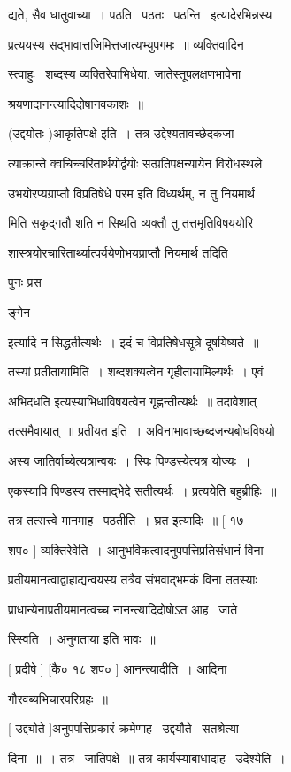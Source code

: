 \documentclass[11pt, openany]{book}
\begin{document}
द्यते, सैव धातुवाच्या~। पठति \textendash\ पठतः \textendash\ पठन्ति \textendash\ इत्यादेरभिन्नस्य 

प्रत्ययस्य सद्भावात्तजिमित्तजात्यभ्युपगमः~॥ व्यक्तिवादिन \textendash\ 

स्त्वाहुः \textendash\ शब्दस्य व्यक्तिरेवाभिधेया, जातेस्तूपलक्षणभावेना \textendash\ 

श्रयणादानन्त्यादिदोषानवकाशः~॥ 

(उद्दयोतः )आकृतिपक्षे इति~। तत्र उद्देश्यतावच्छेदकजा \textendash\ 

त्याक्रान्ते क्वचिच्चरितार्थयोर्द्वयोः सत्प्रतिपक्षन्यायेन विरोधस्थले 

{\qt उभयोरप्यग्राप्तौ विप्रतिषेधे परम} इति विध्यर्थम्, न तु नियमार्थ \textendash\ 

मिति सकृद्गतौ शति न सिथति व्यक्तौ तु तत्तमृतिविषययोरि 

शास्त्रयोरचारितार्थ्यात्पर्ययेणोभयप्राप्तौ नियमार्थ तदिति {\qt पुनः प्रस \textendash\ 

ङ्गेन} इत्यादि न सिद्धतीत्यर्थः~। इदं च विप्रतिषेधसूत्रे दूषयिष्यते~॥


तस्यां प्रतीतायामिति~। शब्दशक्यत्वेन गृहीतायामिल्यर्थः~। एवं 

{\qt अभिदधति} इत्यस्याभिधाविषयत्वेन गृह्णन्तीत्यर्थः~॥ तदावेशात् \textendash\ 

तत्समैवायात्~॥ प्रतीयत इति~। अविनाभावाच्छब्दजन्यबोधविषयो 



अस्य जातिर्वाच्येत्यत्रान्वयः~। स्पिः पिण्डस्येत्यत्र योज्यः~। 

एकस्यापि पिण्डस्य तस्माद्भेदे सतीत्यर्थः~। प्रत्ययेति बहुब्रीहिः~॥ 

तत्र तत्सत्त्वे मानमाह \textendash\ पठतीति~। घ्रत इत्यादिः~॥ [ १७ \textendash\ 

शप० ] व्यक्तिरेवेति~। आनुभविकत्वादनुपपत्तिप्रतिसंधानं विना 

प्रतीयमानत्वाद्वाहाद्यन्वयस्य तत्रैव संभवाद्भमकं विना ततस्याः 

प्राधान्येनाप्रतीयमानत्वच्च नानन्त्यादिदोषोऽत आह \textendash\ जाते \textendash\ 

स्स्विति~। अनुगताया इति भावः~॥ 

[ प्रदीषे ] [कै० १८ शप० ] आनन्त्यादीति~। आदिना 

गौरवब्यभिचारपरिग्रहः~॥ 

[ उद्द्योते ]अनुपपत्तिप्रकारं क्रमेणाह \textendash\ उद्दयौते \textendash\ सतश्रेत्या \textendash\ 

दिना~॥~। तत्र \textendash\ जातिपक्षे~॥ तत्र कार्यस्याबाधादाह \textendash\ उदेश्येति~। 
\end{document}
